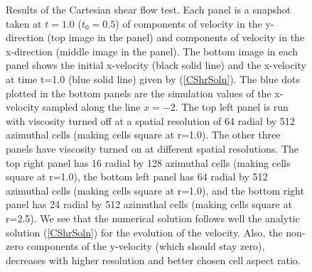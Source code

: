 \begin{figure}
\caption{Results of the Cartesian shear flow test. Each panel is a snapshot taken at $t=1.0$ ($t_0 =  0.5$) of components of velocity in the y-direction (top image in the panel) and components of velocity in the x-direction (middle image in the panel). The bottom image in each panel shows the initial x-velocity (black solid line) and the x-velocity at time t=1.0 (blue solid line) given by (\ref{CShrSoln}). The blue dots plotted in the bottom panels are the simulation values of the x-velocity sampled along the line $x=-2$. The top left panel is run with viscosity turned off at a spatial resolution of 64 radial by 512 azimuthal cells (making cells square at r=1.0).  The other three panels have viscosity turned on at different spatial resolutions. The top right panel has 16 radial by 128 azimuthal cells (making cells square at r=1.0), the bottom left panel has 64 radial by 512 azimuthal cells (making cells square at r=1.0), and the bottom right panel has 24 radial by 512 azimuthal cells (making cells square at r=2.5). We see that the numerical solution follows well the analytic solution (\ref{CShrSoln}) for the evolution of the velocity. Also, the non-zero components of the y-velocity (which should stay zero), decreases with higher resolution and better chosen cell aspect ratio.}
\label{CartShear}
\end{figure}






%
\renewcommand\thesection{\thechapter.\arabic{section}}

